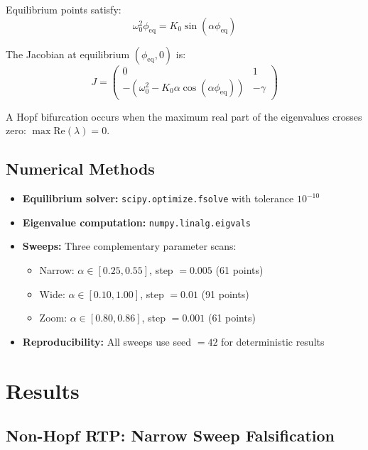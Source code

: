 \documentclass[11pt,twocolumn]{article}
\begin{document}
Equilibrium points satisfy:
\begin{equation}
  \omega_0^2 \phi_{\text{eq}} = K_0 \sin(\alpha \phi_{\text{eq}})
\end{equation}

The Jacobian at equilibrium $(\phi_{\text{eq}}, 0)$ is:
\begin{equation}
  J = \begin{pmatrix}
    0 & 1 \\
    -(\omega_0^2 - K_0 \alpha \cos(\alpha \phi_{\text{eq}})) & -\gamma
  \end{pmatrix}
\end{equation}

A Hopf bifurcation occurs when the maximum real part of the eigenvalues crosses zero:
$\max \mathrm{Re}(\lambda) = 0$.

\subsection{Numerical Methods}

\begin{itemize}
  \item \textbf{Equilibrium solver:} \texttt{scipy.optimize.fsolve} with tolerance $10^{-10}$
  \item \textbf{Eigenvalue computation:} \texttt{numpy.linalg.eigvals}
  \item \textbf{Sweeps:} Three complementary parameter scans:
    \begin{itemize}
      \item Narrow: $\alpha \in [0.25, 0.55]$, step $= 0.005$ (61 points)
      \item Wide: $\alpha \in [0.10, 1.00]$, step $= 0.01$ (91 points)
      \item Zoom: $\alpha \in [0.80, 0.86]$, step $= 0.001$ (61 points)
    \end{itemize}
  \item \textbf{Reproducibility:} All sweeps use seed $= 42$ for deterministic results
\end{itemize}

\section{Results}

\subsection{Non-Hopf RTP: Narrow Sweep Falsification}
\end{document}

